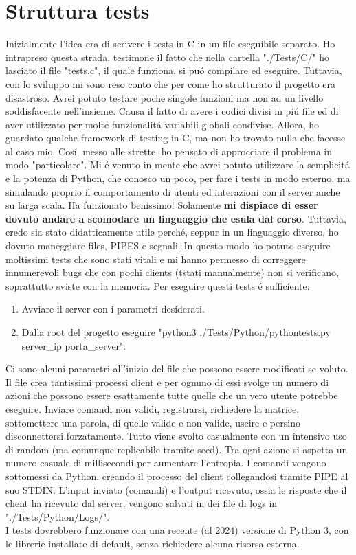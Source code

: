 \chapter{Struttura tests}

Inizialmente l'idea era di scrivere i tests in C in un file eseguibile separato. Ho intrapreso questa strada, testimone il fatto che nella cartella "./Tests/C/" ho lasciato il file "tests.c", il quale funziona, si pu\'o compilare ed eseguire. Tuttavia, con lo sviluppo mi sono reso conto che per come ho strutturato il progetto era disastroso. Avrei potuto testare poche singole funzioni ma non ad un livello soddisfacente nell'insieme. Causa il fatto di avere i codici divisi in pi\'u file ed di aver utilizzato per molte funzionalit\'a variabili globali condivise. Allora, ho guardato qualche framework di testing in C, ma non ho trovato nulla che facesse al caso mio. Cos\'i, messo alle strette, ho pensato di approcciare il problema in modo "particolare". Mi \'e venuto in mente che avrei potuto utilizzare la semplicit\'a e la potenza di Python, che conosco un poco, per fare i tests in modo esterno, ma simulando proprio il comportamento di utenti ed interazioni con il server anche su larga scala. Ha funzionato benissimo! Solamente \textbf{mi dispiace di esser dovuto andare a scomodare un linguaggio che esula dal corso}. Tuttavia, credo sia stato didatticamente utile perch\'e, seppur in un linguaggio diverso, ho dovuto maneggiare files, PIPES e segnali. In questo modo ho potuto eseguire moltissimi tests che sono stati vitali e mi hanno permesso di correggere innumerevoli bugs che con pochi clients (tstati manualmente) non si verificano, soprattutto sviste con la memoria. Per eseguire questi tests \'e sufficiente:

\begin{enumerate}
  \item Avviare il server con i parametri desiderati.
  \item Dalla root del progetto eseguire "python3 ./Tests/Python/pythontests.py server\_ip porta\_server". 
\end{enumerate}
\leavevmode
Ci sono alcuni parametri all'inizio del file che possono essere modificati se voluto. Il file crea tantissimi processi client e per ognuno di essi svolge un numero di azioni che possono essere esattamente tutte quelle che un vero utente potrebbe eseguire. Inviare comandi non validi, registrarsi, richiedere la matrice, sottomettere una parola, di quelle valide e non valide, uscire e persino disconnettersi forzatamente. Tutto viene svolto casualmente con un intensivo uso di random (ma comunque replicabile tramite seed). Tra ogni azione si aspetta un numero casuale di millisecondi per aumentare l'entropia. I comandi vengono sottomessi da Python, creando il processo del client  collegandosi tramite PIPE al suo STDIN. L'input inviato (comandi) e l'output ricevuto, ossia le risposte che il client ha ricevuto dal server, vengono salvati in dei file di logs in "./Tests/Python/Logs/".
\\
I tests dovrebbero funzionare con una recente (al 2024) versione di Python 3, con le librerie installate di default, senza richiedere alcuna risorsa esterna.
